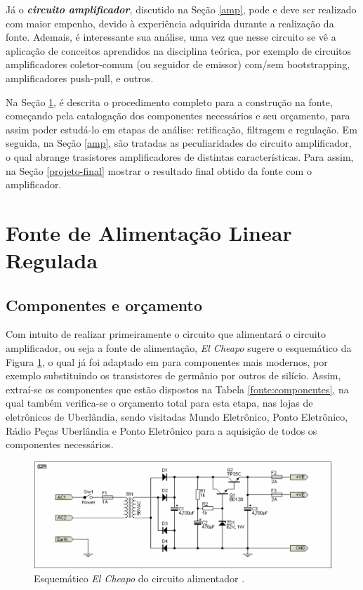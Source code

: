 \documentclass[a4paper,12pt,oneside,openany,table,xcdraw]{article}
\begin{document}
Já o \textbf{\textit{circuito amplificador}}, discutido na Seção \ref{amp}, pode e deve ser realizado com maior empenho, devido à experiência adquirida durante a realização da fonte. Ademais, é interessante sua análise, uma vez que nesse circuito se vê a aplicação de conceitos aprendidos na disciplina teórica, por exemplo de circuitos amplificadores coletor-comum (ou seguidor de emissor) com/sem bootstrapping, amplificadores push-pull, e outros.

Na Seção \ref{fonte}, é descrita o procedimento completo para a construção na fonte, começando pela catalogação dos componentes necessários e seu orçamento, para assim poder estudá-lo em etapas de análise: retificação, filtragem e regulação. Em seguida, na Seção \ref{amp}, são tratadas as peculiaridades do circuito amplificador, o qual abrange trasistores amplificadores de distintas características. Para assim, na Seção \ref{projeto-final} mostrar o resultado final obtido da fonte com o amplificador.

\newpage
\section{Fonte de Alimentação Linear Regulada} \label{fonte}

\subsection{Componentes e orçamento} 
Com intuito de realizar primeiramente o circuito que alimentará o circuito amplificador, ou seja a fonte de alimentação, \emph{El Cheapo} sugere o esquemático da Figura \ref{fonte:esquematico}, o qual já foi adaptado em \cite{cheapo} para componentes mais modernos, por exemplo substituindo os transistores de germânio por outros de silício. Assim, extraí-se os componentes que estão dispostos na Tabela \ref{fonte:componentes}, na qual também verifica-se o orçamento total para esta etapa, nas lojas de eletrônicos de Uberlândia, sendo visitadas Mundo Eletrônico, Ponto Eletrônico, Rádio Peças Uberlândia e Ponto Eletrônico para a aquisição de todos os componentes necessários.
\vspace{0.4cm}

\begin{figure}[H]
\centering
\includegraphics[width=15cm]{fonte-esquematico}
\caption{Esquemático \emph{El Cheapo} do circuito alimentador \cite{cheapo}.}
\label{fonte:esquematico}
\end{figure}
\vspace{0.4cm}
\end{document}
